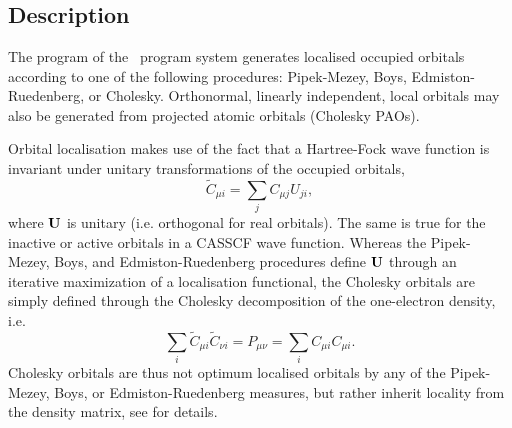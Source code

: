 
\section{}
\label{UG:sec:localisation}

\subsection{Description}
\label{UG:sec:localisation_description}
The  program of the \molcas\ program system generates
localised occupied orbitals according to one of the following procedures:
Pipek-Mezey\cite{Pipek:89},
Boys\cite{Boys:60,Foster:60},
Edmiston-Ruedenberg\cite{Edmiston:63}, or
Cholesky\cite{Aquilante:06a}.
Orthonormal, linearly independent, local orbitals may also be
generated from projected atomic orbitals (Cholesky PAOs)\cite{Aquilante:06a}.

Orbital localisation makes use of the fact that a Hartree-Fock wave function
is invariant under unitary transformations of the occupied orbitals,
\begin{equation}
   {\tilde C}_{\mu i} = \sum_j C_{\mu j} U_{ji} ,
\end{equation}
where ${\bf U}$ is unitary (i.e. orthogonal for real orbitals).
The same is true for the inactive or active orbitals in a CASSCF wave function.
Whereas the Pipek-Mezey\cite{Pipek:89},
Boys\cite{Boys:60,Foster:60}, and
Edmiston-Ruedenberg\cite{Edmiston:63} procedures define ${\bf U}$
through an iterative maximization of a localisation functional,
the Cholesky orbitals are simply defined through the Cholesky decomposition
of the one-electron density, i.e.
\begin{equation}
   \sum_i {\tilde C}_{\mu i}{\tilde C}_{\nu i} = P_{\mu\nu} = \sum_i C_{\mu i} C_{\mu i} .
\end{equation}
Cholesky orbitals are thus not optimum localised orbitals by any of the
Pipek-Mezey, Boys, or Edmiston-Ruedenberg measures, but rather inherit locality
from the density matrix, see \cite{Aquilante:06a} for details.

